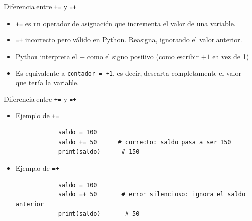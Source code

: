 \documentclass{beamer}
\begin{document}
    \begin{frame}[fragile,t]{Diferencia entre \texttt{+=} y \texttt{=+}}
        \begin{itemize}
            \item \texttt{+=} es un operador de asignación que incrementa el valor de una variable.
            \item \texttt{=+} incorrecto pero válido en Python. Reasigna, ignorando el valor anterior.
            \item Python interpreta el $+$ como el signo positivo (como escribir $+1$ en vez de 1)
            \item Es equivalente a \texttt{contador = +1}, es decir, descarta completamente el valor que 
            tenía la variable.
        \end{itemize}
    \end{frame}

    \begin{frame}[fragile,t]{Diferencia entre \texttt{+=} y \texttt{=+}}
        \begin{itemize}
            \item Ejemplo de \texttt{+=}
            \begin{verbatim}
            saldo = 100
            saldo += 50      # correcto: saldo pasa a ser 150
            print(saldo)      # 150
            \end{verbatim}
            \item Ejemplo de \texttt{=+}
            \begin{verbatim}
            saldo = 100
            saldo =+ 50       # error silencioso: ignora el saldo anterior
            print(saldo)       # 50
            \end{verbatim}
        \end{itemize}
    \end{frame}
\end{document}
